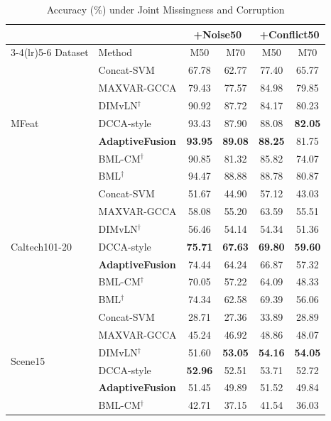 \begin{table}[!t]
\caption{Accuracy (\%) under Joint Missingness and Corruption}
\label{tab:joint}
\centering
\footnotesize
\setlength{\tabcolsep}{2.5pt}
\begin{tabular}{llcccc}
\toprule
& & \multicolumn{2}{c}{+Noise50} & \multicolumn{2}{c}{+Conflict50} \\
\cmidrule(lr){3-4}\cmidrule(lr){5-6}
Dataset & Method & M50 & M70 & M50 & M70 \\
\midrule
\multirow{7}{*}{MFeat} & Concat-SVM & 67.78 & 62.77 & 77.40 & 65.77 \\
 & MAXVAR-GCCA & 79.43 & 77.57 & 84.98 & 79.85 \\
 & DIMvLN$^\dagger$ & 90.92 & 87.72 & 84.17 & 80.23 \\
 & DCCA-style & 93.43 & 87.90 & 88.08 & \textbf{82.05} \\
 & \textbf{AdaptiveFusion} & \textbf{93.95} & \textbf{89.08} & \textbf{88.25} & 81.75 \\
\cmidrule(lr){2-6}
 & BML-CM$^\dagger$ & 90.85 & 81.32 & 85.82 & 74.07 \\
 & BML$^\dagger$ & 94.47 & 88.88 & 88.78 & 80.87 \\
\midrule
\multirow{7}{*}{Caltech101-20} & Concat-SVM & 51.67 & 44.90 & 57.12 & 43.03 \\
 & MAXVAR-GCCA & 58.08 & 55.20 & 63.59 & 55.51 \\
 & DIMvLN$^\dagger$ & 56.46 & 54.14 & 54.34 & 51.36 \\
 & DCCA-style & \textbf{75.71} & \textbf{67.63} & \textbf{69.80} & \textbf{59.60} \\
 & \textbf{AdaptiveFusion} & 74.44 & 64.24 & 66.87 & 57.32 \\
\cmidrule(lr){2-6}
 & BML-CM$^\dagger$ & 70.05 & 57.22 & 64.09 & 48.33 \\
 & BML$^\dagger$ & 74.34 & 62.58 & 69.39 & 56.06 \\
\midrule
\multirow{7}{*}{Scene15} & Concat-SVM & 28.71 & 27.36 & 33.89 & 28.89 \\
 & MAXVAR-GCCA & 45.24 & 46.92 & 48.86 & 48.07 \\
 & DIMvLN$^\dagger$ & 51.60 & \textbf{53.05} & \textbf{54.16} & \textbf{54.05} \\
 & DCCA-style & \textbf{52.96} & 52.51 & 53.71 & 52.72 \\
 & \textbf{AdaptiveFusion} & 51.45 & 49.89 & 51.52 & 49.84 \\
\cmidrule(lr){2-6}
 & BML-CM$^\dagger$ & 42.71 & 37.15 & 41.54 & 36.03 \\

\end{tabular}
\end{table}
